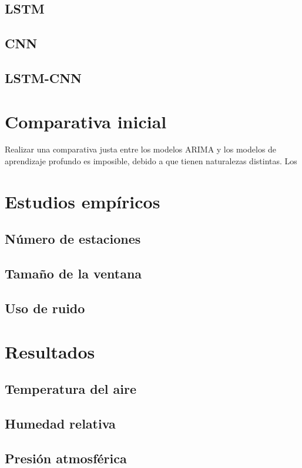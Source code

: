 \subsection{LSTM}

\subsection{CNN}

\subsection{LSTM-CNN}


\section{Comparativa inicial}
Realizar una comparativa justa entre los modelos ARIMA y los modelos de aprendizaje profundo es imposible, debido a que tienen naturalezas distintas.
Los 

\section{Estudios empíricos}

\subsection{Número de estaciones}

\subsection{Tamaño de la ventana}

\subsection{Uso de ruido}

\section{Resultados}
\subsection{Temperatura del aire}
\subsection{Humedad relativa}
\subsection{Presión atmosférica}


